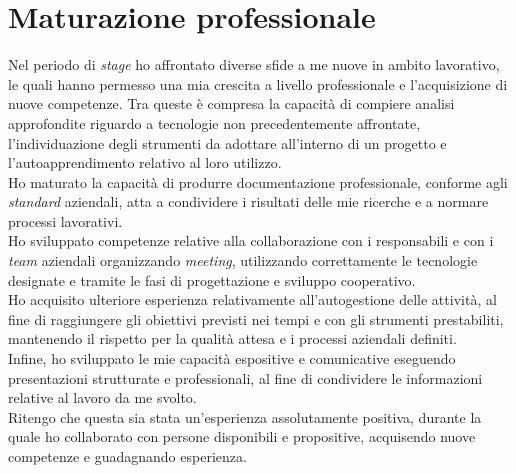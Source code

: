 \section{Maturazione professionale}
Nel periodo di \emph{stage} ho affrontato diverse sfide a me nuove in ambito lavorativo, le quali hanno permesso una mia crescita a livello professionale e l'acquisizione di nuove competenze.
Tra queste è compresa la capacità di compiere analisi approfondite riguardo a tecnologie non precedentemente affrontate, l'individuazione degli strumenti da adottare all'interno di un progetto e l'autoapprendimento relativo al loro utilizzo.\\
Ho maturato la capacità di produrre documentazione professionale, conforme agli \emph{standard} aziendali, atta a condividere i risultati delle mie ricerche e a normare processi lavorativi.\\
Ho sviluppato competenze relative alla collaborazione con i responsabili e con i \emph{team} aziendali organizzando \emph{meeting}, utilizzando correttamente le tecnologie designate e tramite le fasi di progettazione e sviluppo cooperativo.\\
Ho acquisito ulteriore esperienza relativamente all'autogestione delle attività, al fine di raggiungere gli obiettivi previsti nei tempi e con gli strumenti prestabiliti, mantenendo il rispetto per la qualità attesa e i processi aziendali definiti.\\
Infine, ho sviluppato le mie capacità espositive e comunicative eseguendo presentazioni strutturate e professionali, al fine di condividere le informazioni relative al lavoro da me svolto.\\
Ritengo che questa sia stata un'esperienza assolutamente positiva, durante la quale ho collaborato con persone disponibili e propositive, acquisendo nuove competenze e guadagnando esperienza. 

